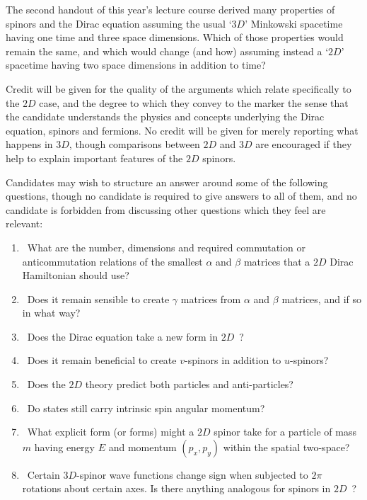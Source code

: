 
\question 

The second handout of this year's lecture course derived many properties of spinors and the Dirac equation assuming the usual `$3D$' Minkowski spacetime having one time and three space dimensions.  
Which of those properties would remain the same, and which would change (and how) assuming instead a `$2D$' spacetime having two space dimensions in addition to time?  

\vspace{5mm}

Credit will be given for the quality of the arguments which relate specifically to the $2D$ case, and the degree to which they convey to the marker the sense that the candidate understands the physics and concepts underlying the Dirac equation, spinors and fermions.  No credit will be given for merely reporting what happens in $3D$, though comparisons between $2D$ and $3D$ are encouraged if they help to explain important features of the $2D$ spinors.

\vspace{5mm}

Candidates may wish to structure an answer around some of the following questions, though no candidate is required to give answers to all of them, and no candidate is forbidden from discussing other questions which they feel are relevant:
\begin{enumerate}
\item\ 
What are the number, dimensions and required commutation or anticommutation relations of the smallest  $\alpha$ and $\beta$ matrices that a $2D$ Dirac Hamiltonian should use?
\item\ 
Does it remain sensible to create $\gamma$ matrices from $\alpha$ and $\beta$ matrices, and if so in what way?
\item\ 
Does the Dirac equation take a new form in $2D$~?
\item\ 
Does it remain beneficial to create $v$-spinors in addition to $u$-spinors?
\item\ 
Does the $2D$ theory predict both particles and anti-particles?
\item\ 
Do states still carry intrinsic spin angular momentum?
\item\ 
What explicit form (or forms) might a $2D$ spinor  take for a particle of mass $m$ having energy $E$ and momentum $(p_x,p_y)$ within the spatial two-space?   
\item\ 
Certain $3D$-spinor wave functions change sign when subjected to $2\pi$ rotations about certain axes. Is there anything analogous  for spinors in $2D$~? 
\end{enumerate}



